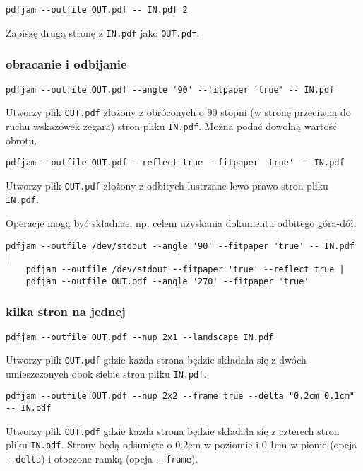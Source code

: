 \documentclass[fontSize=10pt, rmargin=3cm, extra]{pdfArticle}
\begin{document}
\begin{verbatim}
pdfjam --outfile OUT.pdf -- IN.pdf 2
\end{verbatim}
Zapiszę drugą stronę z \Verb$IN.pdf$ jako \Verb$OUT.pdf$.

\subsubsection{obracanie i odbijanie}

\begin{verbatim}
pdfjam --outfile OUT.pdf --angle '90' --fitpaper 'true' -- IN.pdf
\end{verbatim}
Utworzy plik \Verb$OUT.pdf$ złożony z obróconych o 90 stopni (w stronę przeciwną do ruchu wskazówek zegara) stron pliku \Verb$IN.pdf$. Można podać dowolną wartość obrotu.

\begin{verbatim}
pdfjam --outfile OUT.pdf --reflect true --fitpaper 'true' -- IN.pdf
\end{verbatim}
Utworzy plik \Verb$OUT.pdf$ złożony z odbitych lustrzane lewo-prawo stron pliku \Verb$IN.pdf$.

Operacje mogą być składnae, np. celem uzyskania dokumentu odbitego góra-dół:
\begin{verbatim}
pdfjam --outfile /dev/stdout --angle '90' --fitpaper 'true' -- IN.pdf |
	pdfjam --outfile /dev/stdout --fitpaper 'true' --reflect true |
	pdfjam --outfile OUT.pdf --angle '270' --fitpaper 'true'
\end{verbatim}

\subsubsection{kilka stron na jednej}

\begin{verbatim}
pdfjam --outfile OUT.pdf --nup 2x1 --landscape IN.pdf
\end{verbatim}
Utworzy plik \Verb$OUT.pdf$ gdzie każda strona będzie składała się z dwóch umieszczonych obok siebie stron pliku \Verb$IN.pdf$.

\begin{verbatim}
pdfjam --outfile OUT.pdf --nup 2x2 --frame true --delta "0.2cm 0.1cm" -- IN.pdf
\end{verbatim}
Utworzy plik \Verb$OUT.pdf$ gdzie każda strona będzie składała się z czterech stron pliku \Verb$IN.pdf$.
Strony będą odsunięte o 0.2cm w poziomie i 0.1cm w pionie (opcja \Verb$--delta$) i otoczone ramką (opcja \Verb$--frame$).
\end{document}
